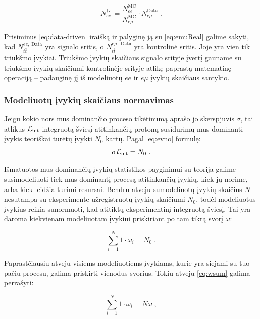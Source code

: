 \documentclass[a4paper, 12pt]{article}
\newcommand{\emu}{e\mu}
\newcommand{\Lumi}{{\cal L}_\mathrm{int}}
\newlength\q
\begin{document}
\begin{equation}
	N_{ee}^{\mathrm{Įv.}} =
	\frac{ N_{ee}^{\mathrm{MC}} }{ N_{\emu}^{\mathrm{MC}} }
	\cdot N_{\emu}^{\mathrm{Data}} \; .
	\label{eq:emuReal}
\end{equation}

Prisiminus \eqref{eq:data-driven} iraišką ir palyginę ją su \eqref{eq:emuReal} galime
sakyti, kad $N_{t\bar{t}}^{ee , \; \mathrm{Data}}$ yra signalo sritis, o
$N_{t\bar{t}}^{e\mu , \; \mathrm{Data}}$ yra kontrolinė sritis. Joje yra vien tik triukšmo
įvykiai.
Triukšmo įvykių skaičiaus signalo srityje įvertį gauname su triukšmo įvykių skaičiumi
kontrolinėje srityje atlikę paprastą matematinę operaciją -- padauginę jį iš modeliuotų
$ee$ ir $\emu$ įvykių skaičiaus santykio.


\subsubsection{Modeliuotų įvykių skaičiaus normavimas}\label{sec:MCweight}

Jeigu kokio nors mus dominančio proceso tikėtinumą aprašo jo skerspjūvis $\sigma$, tai atlikus
$\Lumi$ integruotą šviesį atitinkančių protonų susidūrimų mus dominanti įvykis teoriškai turėtų
įvykti $N_{0}$ kartų. Pagal \eqref{eq:evno} formulę:
\begin{equation}
	\sigma \Lumi=N_{0} \; .
	\label{eq:ilumi}
\end{equation}

Išmatuotos mus dominančių įvykių statistikos payginimui su teorija galime susimodeliuoti tiek mus
dominantį procesą atitinkančių įvykių, kiek jų norime, arba kiek leidžia turimi resursai.
Bendru atveju sumodeliuotų įvykių skaičius $N$ nesutampa su eksperimente užregistruotų įvykių
skaičiumi $N_0$, todėl modeliuotus įvykius reikia sunormuoti, kad atitiktų eksperimentinį
integruotą šviesį.
Tai yra daroma kiekvienam modeliuotam įvykiui priskiriant po tam tikrą svorį $\omega$:

\begin{equation}
	\sum_{i=1}^{N}1\cdot \omega_{i}=N_{0} \; .
	\label{eq:wsum}
\end{equation}

Paprastčiausiu atveju visiems modeliuotiems įvykiams, kurie yra siejami su tuo pačiu procesu,
galima priskirti vienodus svorius. Tokiu atveju \eqref{eq:wsum} galima perrašyti:

\begin{equation}
	\sum_{i=1}^{N} 1 \cdot \omega_{i} = N \omega \; ,
	\label{eq:swsum}
\end{equation}
\end{document}
